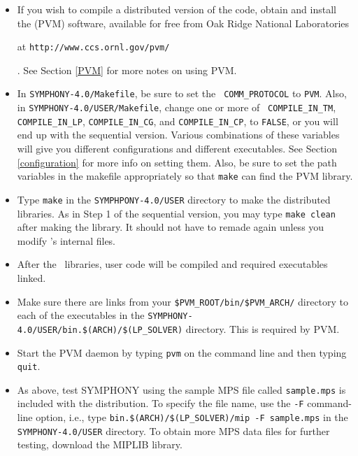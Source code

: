 \begin{itemize}
        \item If you wish to compile a distributed version of the code, obtain
and install the {\em {}} (PVM) software, available for free
from Oak Ridge National Laboratories
\begin{latexonly}
        at {\tt http://www.ccs.ornl.gov/pvm/}
\end{latexonly}. 
        See Section \ref{PVM} for more notes on using PVM.
        
        \item In \texttt{SYMPHONY-4.0/Makefile}, be sure to set the {\tt
        COMM\_PROTOCOL} to {\tt PVM}. Also, in
        \texttt{SYMPHONY-4.0/USER/Makefile}, change one or more of {\tt
        COMPILE\_IN\_TM}, {\tt COMPILE\_IN\_LP}, {\tt COMPILE\_IN\_CG}, and
        {\tt COMPILE\_IN\_CP}, to {\tt FALSE}, or you will end up with the
        sequential version. Various combinations of these variables will give
        you different configurations and different executables. See Section
        \ref{configuration} for more info on setting them. Also, be sure to
        set the path variables in the makefile appropriately so that 
	\texttt{make} can find the PVM library.

        \item Type {\tt make} in the \texttt{SYMPHPONY-4.0/USER} directory to
        make the distributed libraries. As in Step 1 of the sequential
        version, you may type {\tt make clean} after making the
        library. It should not have to remade again unless you modify
        \BB's internal files.

        \item After the \BB\ libraries, user code will be compiled and
        required executables linked.

        \item Make sure there are links from your
        \texttt{\$PVM\_ROOT/bin/\$PVM\_ARCH/} directory to each of the
        executables in the
        \texttt{SYMPHONY-4.0/USER/bin.\$(ARCH)/\$(LP\_SOLVER)} directory. 
	This is required by PVM.

        \item Start the PVM daemon by typing {\tt pvm} on the command line
        and then typing {\tt quit}.

        \item As above, test SYMPHONY using the sample MPS file called
        \texttt{sample.mps} is included with the distribution. To specify the
        file name, use the \texttt{-F} command-line option, i.e., type
        \texttt{bin.\$(ARCH)/\$(LP\_SOLVER)/mip -F sample.mps} in the
        \texttt{SYMPHONY-4.0/USER} directory. To obtain more MPS data files
        for further testing, download the MIPLIB library.


\end{itemize}
